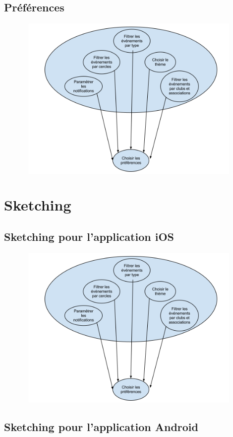 \documentclass[a4paper, 11px]{article}
\begin{document}
\subsection{Préférences}
\begin{figure}[h!]
\includegraphics[width=18cm,height=8cm]{IUApreferences.png}
\end{figure}
\newpage

\section{Sketching}

\subsection{Sketching pour l'application iOS}
\vfill
\begin{figure}[h!]
\includegraphics[width=18cm,height=8cm]{IUApreferences.png}
\end{figure}
\vfill
\clearpage
\subsection{Sketching pour l'application Android}
\end{document}
